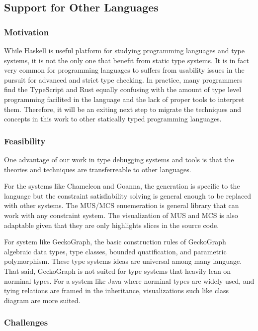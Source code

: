 \subsection{Support for Other Languages}
\subsubsection{Motivation}
While Haskell is useful platform for studying programming languages and type systems, it is not the only one that benefit from static type systems. It is in fact very common for programming languages to suffers from usability issues in the pursuit for advanced and strict type checking. In practice, many programmers find the TypeScript and Rust equally confusing with the amount of type level programming facilited in the language and the lack of proper tools to interpret them. Therefore, it will be an exiting next step to migrate the techniques and concepts in this work to other statically typed programming languages. 

\subsubsection{Feasibility}

One advantage of our work in type debugging systems and tools is that the theories and techniques are transferreable to other languages.  

For the systems like Chameleon and Goanna, the generation is specific to the language but the constraint satisfiability solving is general enough to be replaced with other systems. The MUS/MCS enuemeration is general library that can work with any constraint system. The visualization of MUS and MCS is also adaptable given that they are only highlights slices in the source code.

For system like GeckoGraph, the basic construction rules of GeckoGraph algebraic data types, type classes, bounded quatification, and parametric polymorphism. These type systems ideas are universal among many language. That said, GeckoGraph is not suited for type systems that heavily lean on norminal types. For a system like Java where norminal types are widely used, and tying relations are framed in the inheritance, visualizations such like class diagram are more suited. 



\subsubsection{Challenges}

